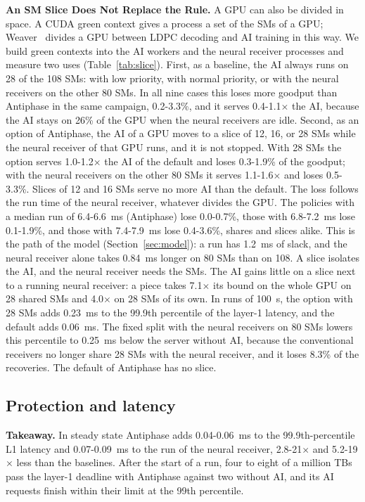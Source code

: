 \documentclass[acmsmall,screen,review,anonymous]{acmart}
\newcommand{\sys}{Antiphase\xspace}
\begin{document}
\noindent\textbf{An SM Slice Does Not Replace the Rule.} A GPU can also be divided in space. A CUDA green
context gives a process a set of the SMs of a GPU; Weaver~\cite{weaver} divides a GPU between LDPC decoding
and AI training in this way. We build green contexts into the AI workers and the neural receiver processes
and measure two uses (Table~\ref{tab:slice}). First, as a baseline, the AI always runs on 28 of the 108 SMs:
with low priority, with normal priority, or with the neural receivers on the other 80 SMs. In all nine cases
this loses more goodput than \sys in the same campaign, 0.2-3.3\%, and it serves 0.4-1.1$\times$ the AI,
because the AI stays on 26\% of the GPU when the neural receivers are idle. Second, as an option of \sys, the
AI of a GPU moves to a slice of 12, 16, or 28 SMs while the neural receiver of that GPU runs, and it is not
stopped. With 28 SMs the option serves 1.0-1.2$\times$ the AI of the default and loses 0.3-1.9\% of the
goodput; with the neural receivers on the other 80 SMs it serves 1.1-1.6$\times$ and loses 0.5-3.3\%. Slices
of 12 and 16 SMs serve no more AI than the default. The loss follows the run time of the neural receiver,
whatever divides the GPU. The policies with a median run of 6.4-6.6~ms (\sys) lose 0.0-0.7\%, those with
6.8-7.2~ms lose 0.1-1.9\%, and those with 7.4-7.9~ms lose 0.4-3.6\%, shares and slices alike. This is the
path of the model (Section~\ref{sec:model}): a run has 1.2~ms of slack, and the neural receiver alone takes
0.84~ms longer on 80 SMs than on 108. A slice isolates the AI, and the neural receiver needs the SMs. The AI
gains little on a slice next to a running neural receiver: a piece takes 7.1$\times$ its bound on the whole
GPU on 28 shared SMs and 4.0$\times$ on 28 SMs of its own. In runs of 100~s, the option with 28 SMs adds
0.23~ms to the 99.9th percentile of the layer-1 latency, and the default adds 0.06~ms. The fixed split with
the neural receivers on 80 SMs lowers this percentile to 0.25~ms below the server without AI, because the
conventional receivers no longer share 28 SMs with the neural receiver, and it loses 8.3\% of the recoveries.
The default of \sys has no slice.

\subsection{Protection and latency}
\label{sec:protect}

\noindent\textbf{Takeaway.} In steady state \sys adds 0.04-0.06~ms to the 99.9th-percentile L1 latency and
0.07-0.09~ms to the run of the neural receiver, 2.8-21$\times$ and 5.2-19$\times$ less than the baselines.
After the start of a run, four to eight of a million TBs pass the layer-1 deadline with \sys against two without AI, and its AI requests
finish within their limit at the 99th percentile.
\end{document}
